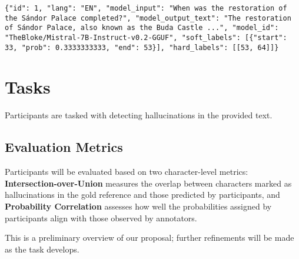 \documentclass{article}
\begin{document}
\begin{verbatim}
{"id": 1, "lang": "EN", "model_input": "When was the restoration of the Sándor Palace completed?", "model_output_text": "The restoration of Sándor Palace, also known as the Buda Castle ...", "model_id": "TheBloke/Mistral-7B-Instruct-v0.2-GGUF", "soft_labels": [{"start": 33, "prob": 0.3333333333, "end": 53}], "hard_labels": [[53, 64]]}
\end{verbatim}

\section{Tasks}

Participants are tasked with detecting hallucinations in the provided text. 

\subsection{Evaluation Metrics}

Participants will be evaluated based on two character-level metrics: \textbf{Intersection-over-Union} measures the overlap between characters marked as hallucinations in the gold reference and those predicted by participants, and \textbf{Probability Correlation} assesses how well the probabilities assigned by participants align with those observed by annotators.

This is a preliminary overview of our proposal; further refinements will be made as the task develops.
\end{document}
